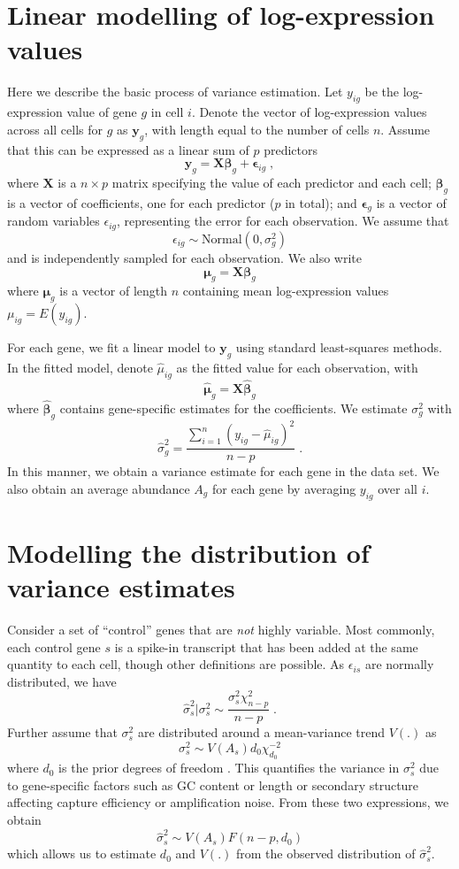 \documentclass{article}
\begin{document}
\section{Linear modelling of log-expression values}
Here we describe the basic process of variance estimation.
Let $y_{ig}$ be the log-expression value of gene $g$ in cell $i$.
Denote the vector of log-expression values across all cells for $g$ as $\bm{y}_g$, with length equal to the number of cells $n$.
Assume that this can be expressed as a linear sum of $p$ predictors
\[
\bm{y}_g = \bm{X}\bm{\beta}_g + \bm{\epsilon}_{ig} \;,
\]
where $\bm{X}$ is a $n\times p$ matrix specifying the value of each predictor and each cell;
$\bm{\beta}_g$ is a vector of coefficients, one for each predictor ($p$ in total);
and $\bm{\epsilon}_{g}$ is a vector of random variables $\epsilon_{ig}$, representing the error for each observation.
We assume that 
\[
    \epsilon_{ig} \sim \mbox{Normal}(0, \sigma^2_g)
\]
and is independently sampled for each observation.
We also write
\[
\bm{\mu}_g = \bm{X}\bm{\beta}_g
\]
where $\bm{\mu}_g$ is a vector of length $n$ containing mean log-expression values $\mu_{ig} = E(y_{ig})$.

For each gene, we fit a linear model to $\bm{y}_g$ using standard least-squares methods.
In the fitted model, denote $\hat\mu_{ig}$ as the fitted value for each observation, with
\[
\bm{\hat\mu}_{g} = \bm{X} \bm{\hat\beta}_g
\]
where $\bm{\hat\beta}_g$ contains gene-specific estimates for the coefficients.
We estimate $\sigma^2_g$ with
\[
\hat\sigma^2_g = \frac{\sum_{i=1}^{n} (y_{ig} - \hat\mu_{ig})^2}{n-p} \;.
\] 
In this manner, we obtain a variance estimate for each gene in the data set.
We also obtain an average abundance $A_g$ for each gene by averaging $y_{ig}$ over all $i$.

\section{Modelling the distribution of variance estimates}
Consider a set of ``control'' genes that are \textit{not} highly variable. 
Most commonly, each control gene $s$ is a spike-in transcript that has been added at the same quantity to each cell, though other definitions are possible.
As $\epsilon_{is}$ are normally distributed, we have
\[
    \hat\sigma^2_s|\sigma^2_s \sim \frac{\sigma^2_s\chi^2_{n-p}}{n-p} \;.
\]
Further assume that $\sigma^2_s$ are distributed around a mean-variance trend $V(.)$ as
\[
\sigma^2_s \sim V(A_s) d_0 \chi^{-2}_{d_0}
\]
where $d_0$ is the prior degrees of freedom \citep{smyth2004linear}.
This quantifies the variance in $\sigma^2_s$ due to gene-specific factors such as GC content or length or secondary structure affecting capture efficiency or amplification noise.
From these two expressions, we obtain
\begin{equation}
    \hat\sigma^2_s \sim V(A_s)F(n-p, d_0) \label{eqn:estdist}
\end{equation}
which allows us to estimate $d_0$ and $V(.)$ from the observed distribution of $\hat\sigma^2_s$.
\end{document}

